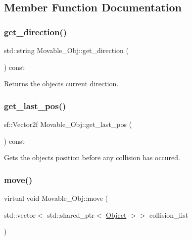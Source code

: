 \subsection{Member Function Documentation}
\mbox{\label{classMovable__Obj_acb1cdd44fbc468eadd152e2a4da87771}} 
\subsubsection{\texorpdfstring{get\+\_\+direction()}{get\_direction()}}
{\footnotesize\ttfamily std\+::string Movable\+\_\+\+Obj\+::get\+\_\+direction (\begin{DoxyParamCaption}{ }\end{DoxyParamCaption}) const}

Returns the objects current direction. \mbox{\label{classMovable__Obj_a33446d36817aa0c0e677b26486ea58fc}} 
\subsubsection{\texorpdfstring{get\+\_\+last\+\_\+pos()}{get\_last\_pos()}}
{\footnotesize\ttfamily sf\+::\+Vector2f Movable\+\_\+\+Obj\+::get\+\_\+last\+\_\+pos (\begin{DoxyParamCaption}{ }\end{DoxyParamCaption}) const}

Gets the objects position before any collision has occured. \mbox{\label{classMovable__Obj_a7bc9fbcd4dede97c2fae66c0502c8ead}} 
\subsubsection{\texorpdfstring{move()}{move()}}
{\footnotesize\ttfamily virtual void Movable\+\_\+\+Obj\+::move (\begin{DoxyParamCaption}\item[{std\+::vector$<$ std\+::shared\+\_\+ptr$<$ \hyperlink{classObject}{Object} $>$$>$}]{collision\+\_\+list }\end{DoxyParamCaption})\hspace{0.3cm}{\ttfamily [pure virtual]}}

